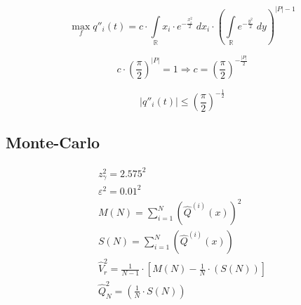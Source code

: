 \begin{equation*}
  \max_f{q''_i\left( t \right)}
  =
  c \cdot
  \int\limits_{\mathbb{R}} x_i \cdot e^{- \frac{x_i^2}{2}} \;dx_i
  \cdot
  \left(
    \int\limits_{\mathbb{R}} e^{- \frac{y^2}{2}} \;dy
  \right)^{\left| P \right| - 1}
\end{equation*}

\begin{equation*}
  c \cdot \left( \frac{\pi}{2} \right)^{\left| P \right|} = 1
  \Longrightarrow
  c = \left( \frac{\pi}{2} \right)^{- \frac{\left| P \right|}{2}}
\end{equation*}

\begin{equation*}
  \left| q''_i\left( t \right) \right|
  \le \left( \frac{\pi}{2} \right)^{- \frac{1}{2}}
\end{equation*}

\subsection{Monte-Carlo}

\begin{equation*}
  \begin{split}
    z^2_{\gamma} = 2.575^2 \\
    \varepsilon^2 = 0.01^2 \\
    M\left( N \right) = \sum_{i=1}^{N} \left(
        \hat{Q}^{\left( i \right)}\left( x \right)
      \right)^2 \\
      S\left( N \right) = \sum_{i=1}^{N} \left(
      \hat{Q}^{\left( i \right)}\left( x \right)
      \right) \\
    \hat{V}^2_r = \frac{1}{N-1}
      \cdot \left[ M\left( N \right) - \frac{1}{N}
        \cdot \left( S\left( N \right) \right) \right] \\
    \hat{Q}^2_N = \left( \frac{1}{N} \cdot S\left( N \right) \right)
  \end{split}
\end{equation*}
